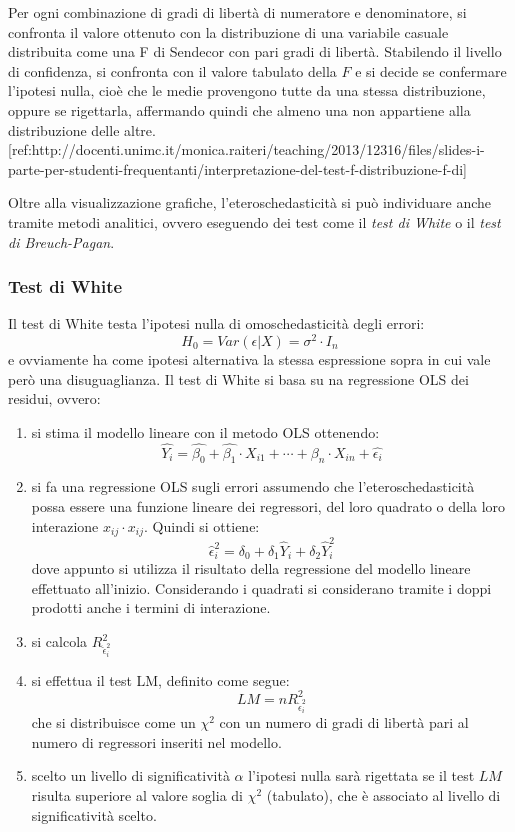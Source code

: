 \documentclass[]{article}
\begin{document}
\begin{tcolorbox}[colback=cyan!5!white, colframe=cyan!75!black, title = ANOVA]
	Per ogni combinazione di gradi di libertà di numeratore e denominatore, si confronta il valore ottenuto con la distribuzione di una variabile casuale distribuita come una F di Sendecor con pari gradi di libertà. Stabilendo il livello di confidenza, si confronta con il valore tabulato della $F$ e si decide se confermare l'ipotesi nulla, cioè che le medie provengono tutte da una stessa distribuzione, oppure se rigettarla, affermando quindi che almeno una non appartiene alla distribuzione delle altre.	
	[ref:http://docenti.unimc.it/monica.raiteri/teaching/2013/12316/files/slides-i-parte-per-studenti-frequentanti/interpretazione-del-test-f-distribuzione-f-di]
\end{tcolorbox}
Oltre alla visualizzazione grafiche, l'eteroschedasticità si può individuare anche tramite metodi analitici, ovvero eseguendo dei test come il \textit{test di White} o il \textit{test di Breuch-Pagan}.
\subsubsection{Test di White}
Il test di White testa l'ipotesi nulla di omoschedasticità degli errori:
\begin{equation}
	H_0 = Var(\epsilon \vert X) = \sigma^2 \cdot I_n
\end{equation}
e ovviamente ha come ipotesi alternativa la stessa espressione sopra in cui vale però una disuguaglianza.
Il test di White si basa su na regressione OLS dei residui, ovvero:
\begin{enumerate}
	\item si stima il modello lineare con il metodo OLS ottenendo:
	\begin{equation}
		\hat{Y_i} = \hat{\beta_0} + \hat{\beta_1} \cdot X_{i1} + \cdots + \beta_n \cdot X_{in} + \hat{\epsilon_i}
	\end{equation}
	\item si fa una regressione OLS  sugli errori assumendo che l'eteroschedasticità possa essere una funzione lineare dei regressori, del loro quadrato o della loro interazione $x_{ij}\cdot x_{ij}$. Quindi si ottiene:
	\begin{equation}
		\hat{\epsilon}_i^2 = \delta_0 + \delta_1 \hat{Y}_i + \delta_2 \hat{Y}_i^2
	\end{equation}
	dove appunto si utilizza il risultato della regressione del modello lineare effettuato all'inizio. Considerando i quadrati si considerano tramite i doppi prodotti anche i termini di interazione.
	\item si calcola $R^2_{\hat{\epsilon}_i^2}$
	\item si effettua il test LM, definito come segue:
	\begin{equation}
		LM = nR^2_{\hat{\epsilon}_i^2}
	\end{equation}
	che si distribuisce come un $\chi^2$ con un numero di gradi di libertà pari al numero di regressori inseriti nel modello.
	\item scelto un livello di significatività $\alpha$ l'ipotesi nulla sarà rigettata se il test $LM$ risulta superiore al valore soglia di $\chi^2$ (tabulato), che è associato al livello di significatività scelto.
\end{enumerate}
\end{document}
